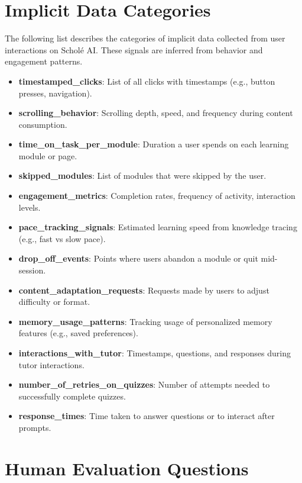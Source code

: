 \documentclass[sigconf]{acmart}
\begin{document}
\section{Implicit Data Categories}
\label{appendix:implicit_data}

The following list describes the categories of implicit data collected from user interactions on Schol\'e AI. These signals are inferred from behavior and engagement patterns.

{\footnotesize
\begin{itemize}
    \item \textbf{timestamped\_clicks}: List of all clicks with timestamps (e.g., button presses, navigation).
    \item \textbf{scrolling\_behavior}: Scrolling depth, speed, and frequency during content consumption.
    \item \textbf{time\_on\_task\_per\_module}: Duration a user spends on each learning module or page.
    \item \textbf{skipped\_modules}: List of modules that were skipped by the user.
    \item \textbf{engagement\_metrics}: Completion rates, frequency of activity, interaction levels.
    \item \textbf{pace\_tracking\_signals}: Estimated learning speed from knowledge tracing (e.g., fast vs slow pace).
    \item \textbf{drop\_off\_events}: Points where users abandon a module or quit mid-session.
    \item \textbf{content\_adaptation\_requests}: Requests made by users to adjust difficulty or format.
    \item \textbf{memory\_usage\_patterns}: Tracking usage of personalized memory features (e.g., saved preferences).
    \item \textbf{interactions\_with\_tutor}: Timestamps, questions, and responses during tutor interactions.
    \item \textbf{number\_of\_retries\_on\_quizzes}: Number of attempts needed to successfully complete quizzes.
    \item \textbf{response\_times}: Time taken to answer questions or to interact after prompts.
\end{itemize}
}

\section{Human Evaluation Questions}
\label{appendix:questions}
\end{document}
